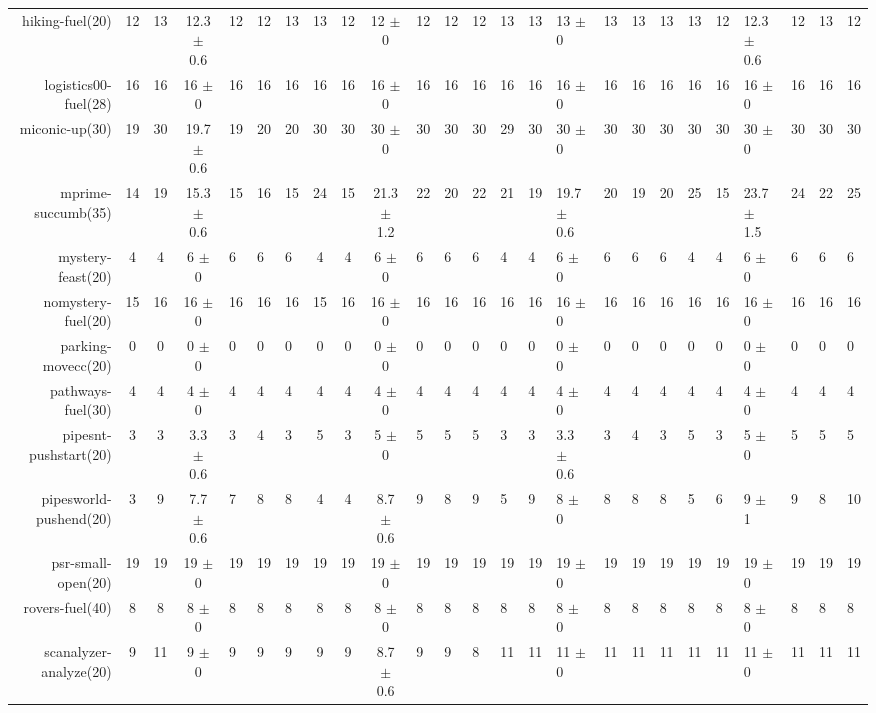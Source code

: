 \begin{center}
\begin{tabular}{|rcccHHH|cccHHHHHHHHHHHHHHH|}
hiking-fuel(20) & 12 & 13 & 12.3 \(\pm\) 0.6 & 12 & 12 & 13 & 13 & 12 & 12 \(\pm\) 0 & 12 & 12 & 12 & 13 & 13 & 13 \(\pm\) 0 & 13 & 13 & 13 & 13 & 12 & 12.3 \(\pm\) 0.6 & 12 & 13 & 12\\
logistics00-fuel(28) & 16 & 16 & 16 \(\pm\) 0 & 16 & 16 & 16 & 16 & 16 & 16 \(\pm\) 0 & 16 & 16 & 16 & 16 & 16 & 16 \(\pm\) 0 & 16 & 16 & 16 & 16 & 16 & 16 \(\pm\) 0 & 16 & 16 & 16\\
miconic-up(30) & 19 & 30 & 19.7 \(\pm\) 0.6 & 19 & 20 & 20 & 30 & 30 & 30 \(\pm\) 0 & 30 & 30 & 30 & 29 & 30 & 30 \(\pm\) 0 & 30 & 30 & 30 & 30 & 30 & 30 \(\pm\) 0 & 30 & 30 & 30\\
mprime-succumb(35) & 14 & 19 & 15.3 \(\pm\) 0.6 & 15 & 16 & 15 & 24 & 15 & 21.3 \(\pm\) 1.2 & 22 & 20 & 22 & 21 & 19 & 19.7 \(\pm\) 0.6 & 20 & 19 & 20 & 25 & 15 & 23.7 \(\pm\) 1.5 & 24 & 22 & 25\\
mystery-feast(20) & 4 & 4 & 6 \(\pm\) 0 & 6 & 6 & 6 & 4 & 4 & 6 \(\pm\) 0 & 6 & 6 & 6 & 4 & 4 & 6 \(\pm\) 0 & 6 & 6 & 6 & 4 & 4 & 6 \(\pm\) 0 & 6 & 6 & 6\\
nomystery-fuel(20) & 15 & 16 & 16 \(\pm\) 0 & 16 & 16 & 16 & 15 & 16 & 16 \(\pm\) 0 & 16 & 16 & 16 & 16 & 16 & 16 \(\pm\) 0 & 16 & 16 & 16 & 16 & 16 & 16 \(\pm\) 0 & 16 & 16 & 16\\
parking-movecc(20) & 0 & 0 & 0 \(\pm\) 0 & 0 & 0 & 0 & 0 & 0 & 0 \(\pm\) 0 & 0 & 0 & 0 & 0 & 0 & 0 \(\pm\) 0 & 0 & 0 & 0 & 0 & 0 & 0 \(\pm\) 0 & 0 & 0 & 0\\
pathways-fuel(30) & 4 & 4 & 4 \(\pm\) 0 & 4 & 4 & 4 & 4 & 4 & 4 \(\pm\) 0 & 4 & 4 & 4 & 4 & 4 & 4 \(\pm\) 0 & 4 & 4 & 4 & 4 & 4 & 4 \(\pm\) 0 & 4 & 4 & 4\\
pipesnt-pushstart(20) & 3 & 3 & 3.3 \(\pm\) 0.6 & 3 & 4 & 3 & 5 & 3 & 5 \(\pm\) 0 & 5 & 5 & 5 & 3 & 3 & 3.3 \(\pm\) 0.6 & 3 & 4 & 3 & 5 & 3 & 5 \(\pm\) 0 & 5 & 5 & 5\\
pipesworld-pushend(20) & 3 & 9 & 7.7 \(\pm\) 0.6 & 7 & 8 & 8 & 4 & 4 & 8.7 \(\pm\) 0.6 & 9 & 8 & 9 & 5 & 9 & 8 \(\pm\) 0 & 8 & 8 & 8 & 5 & 6 & 9 \(\pm\) 1 & 9 & 8 & 10\\
psr-small-open(20) & 19 & 19 & 19 \(\pm\) 0 & 19 & 19 & 19 & 19 & 19 & 19 \(\pm\) 0 & 19 & 19 & 19 & 19 & 19 & 19 \(\pm\) 0 & 19 & 19 & 19 & 19 & 19 & 19 \(\pm\) 0 & 19 & 19 & 19\\
rovers-fuel(40) & 8 & 8 & 8 \(\pm\) 0 & 8 & 8 & 8 & 8 & 8 & 8 \(\pm\) 0 & 8 & 8 & 8 & 8 & 8 & 8 \(\pm\) 0 & 8 & 8 & 8 & 8 & 8 & 8 \(\pm\) 0 & 8 & 8 & 8\\
scanalyzer-analyze(20) & 9 & 11 & 9 \(\pm\) 0 & 9 & 9 & 9 & 9 & 9 & 8.7 \(\pm\) 0.6 & 9 & 9 & 8 & 11 & 11 & 11 \(\pm\) 0 & 11 & 11 & 11 & 11 & 11 & 11 \(\pm\) 0 & 11 & 11 & 11\\

\end{tabular}
\end{center}
